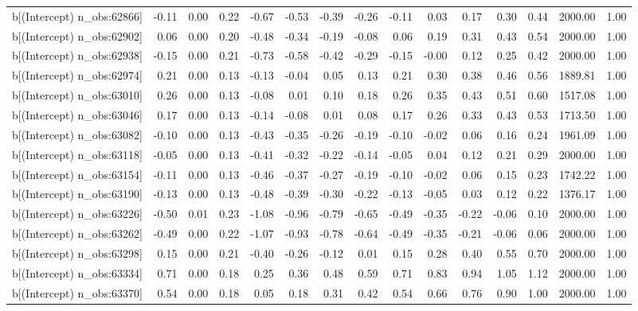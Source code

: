 \begin{table}[ht]
\begin{tabular}{rrrrrrrrrrrrrrr}
  b[(Intercept) n\_obs:62866] & -0.11 & 0.00 & 0.22 & -0.67 & -0.53 & -0.39 & -0.26 & -0.11 & 0.03 & 0.17 & 0.30 & 0.44 & 2000.00 & 1.00 \\ 
  b[(Intercept) n\_obs:62902] & 0.06 & 0.00 & 0.20 & -0.48 & -0.34 & -0.19 & -0.08 & 0.06 & 0.19 & 0.31 & 0.43 & 0.54 & 2000.00 & 1.00 \\ 
  b[(Intercept) n\_obs:62938] & -0.15 & 0.00 & 0.21 & -0.73 & -0.58 & -0.42 & -0.29 & -0.15 & -0.00 & 0.12 & 0.25 & 0.42 & 2000.00 & 1.00 \\ 
  b[(Intercept) n\_obs:62974] & 0.21 & 0.00 & 0.13 & -0.13 & -0.04 & 0.05 & 0.13 & 0.21 & 0.30 & 0.38 & 0.46 & 0.56 & 1889.81 & 1.00 \\ 
  b[(Intercept) n\_obs:63010] & 0.26 & 0.00 & 0.13 & -0.08 & 0.01 & 0.10 & 0.18 & 0.26 & 0.35 & 0.43 & 0.51 & 0.60 & 1517.08 & 1.00 \\ 
  b[(Intercept) n\_obs:63046] & 0.17 & 0.00 & 0.13 & -0.14 & -0.08 & 0.01 & 0.08 & 0.17 & 0.26 & 0.33 & 0.43 & 0.53 & 1713.50 & 1.00 \\ 
  b[(Intercept) n\_obs:63082] & -0.10 & 0.00 & 0.13 & -0.43 & -0.35 & -0.26 & -0.19 & -0.10 & -0.02 & 0.06 & 0.16 & 0.24 & 1961.09 & 1.00 \\ 
  b[(Intercept) n\_obs:63118] & -0.05 & 0.00 & 0.13 & -0.41 & -0.32 & -0.22 & -0.14 & -0.05 & 0.04 & 0.12 & 0.21 & 0.29 & 2000.00 & 1.00 \\ 
  b[(Intercept) n\_obs:63154] & -0.11 & 0.00 & 0.13 & -0.46 & -0.37 & -0.27 & -0.19 & -0.10 & -0.02 & 0.06 & 0.15 & 0.23 & 1742.22 & 1.00 \\ 
  b[(Intercept) n\_obs:63190] & -0.13 & 0.00 & 0.13 & -0.48 & -0.39 & -0.30 & -0.22 & -0.13 & -0.05 & 0.03 & 0.12 & 0.22 & 1376.17 & 1.00 \\ 
  b[(Intercept) n\_obs:63226] & -0.50 & 0.01 & 0.23 & -1.08 & -0.96 & -0.79 & -0.65 & -0.49 & -0.35 & -0.22 & -0.06 & 0.10 & 2000.00 & 1.00 \\ 
  b[(Intercept) n\_obs:63262] & -0.49 & 0.00 & 0.22 & -1.07 & -0.93 & -0.78 & -0.64 & -0.49 & -0.35 & -0.21 & -0.06 & 0.06 & 2000.00 & 1.00 \\ 
  b[(Intercept) n\_obs:63298] & 0.15 & 0.00 & 0.21 & -0.40 & -0.26 & -0.12 & 0.01 & 0.15 & 0.28 & 0.40 & 0.55 & 0.70 & 2000.00 & 1.00 \\ 
  b[(Intercept) n\_obs:63334] & 0.71 & 0.00 & 0.18 & 0.25 & 0.36 & 0.48 & 0.59 & 0.71 & 0.83 & 0.94 & 1.05 & 1.12 & 2000.00 & 1.00 \\ 
  b[(Intercept) n\_obs:63370] & 0.54 & 0.00 & 0.18 & 0.05 & 0.18 & 0.31 & 0.42 & 0.54 & 0.66 & 0.76 & 0.90 & 1.00 & 2000.00 & 1.00 \\ 

\end{tabular}
\end{table}
